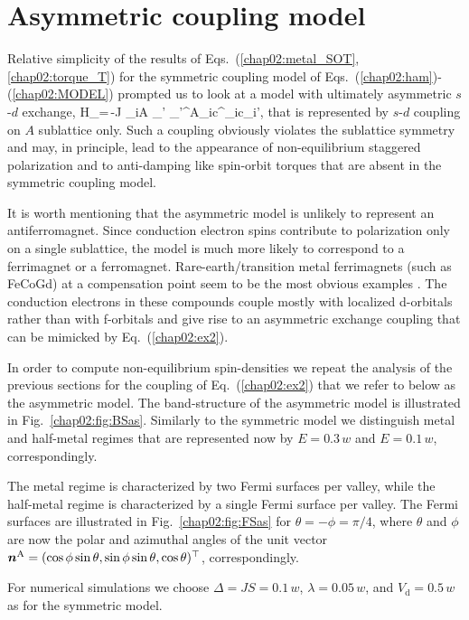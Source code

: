 \section{Asymmetric coupling model} 

Relative simplicity of the results of Eqs.~(\ref{chap02:metal_SOT},\ref{chap02:torque_T}) for the symmetric coupling model of Eqs.~(\ref{chap02:ham})-(\ref{chap02:MODEL}) prompted us to look at a model with ultimately asymmetric $s$-$d$ exchange,
\be
H_=\,-J \s_{i\in A }  \s_{\sigma\sigma'} \bb{\sigma}_{\sigma\sigma'}^\textrm{A}_i\cdot c^\dagger_{i\sigma}c\0_{i\sigma'},
\label{chap02:ex2}
\e
that is represented by $s$-$d$ coupling on $A$ sublattice only. Such a coupling obviously violates the sublattice symmetry and may, in principle, lead to the appearance of non-equilibrium staggered polarization and to anti-damping like spin-orbit torques that are absent in the symmetric coupling model. 

It is worth mentioning that the asymmetric model is unlikely to represent an antiferromagnet. Since conduction electron spins contribute to polarization only on a single sublattice, the model is much more likely to correspond to a ferrimagnet or a ferromagnet.  Rare-earth/transition metal ferrimagnets (such as FeCoGd) at a compensation point seem to be the most obvious examples \cite{jungfleisch_perspectives_2018}. The conduction electrons in these compounds couple mostly with localized d-orbitals rather than with f-orbitals and give rise to an asymmetric exchange coupling that can be mimicked by Eq.~(\ref{chap02:ex2}). 

In order to compute non-equilibrium spin-densities we repeat the analysis of the previous sections for the coupling of Eq.~(\ref{chap02:ex2}) that we refer to below as the asymmetric model. The band-structure of the asymmetric model is illustrated in Fig.~\ref{chap02:fig:BSas}. Similarly to the symmetric model we distinguish metal and half-metal regimes that are represented now by $E=0.3\,w$ and $E=0.1\,w$, correspondingly. 

The metal regime is characterized by two Fermi surfaces per valley, while the half-metal regime is characterized by a single Fermi surface per valley. The Fermi surfaces are illustrated in Fig.~\ref{chap02:fig:FSas} for $\theta=-\phi=\pi/4$, where $\theta$ and $\phi$ are now the polar and azimuthal angles of the unit vector $\boldsymbol{n}^\textrm{A}=(\cos\phi\sin\theta,\sin\phi\sin\theta,\cos\theta)^\top$, correspondingly. 

For numerical simulations we choose $\Delta= J S=0.1\,w$, $\lambda=0.05\,w$, and $V_\textrm{d}=0.5\,w$ as for the symmetric model. 

